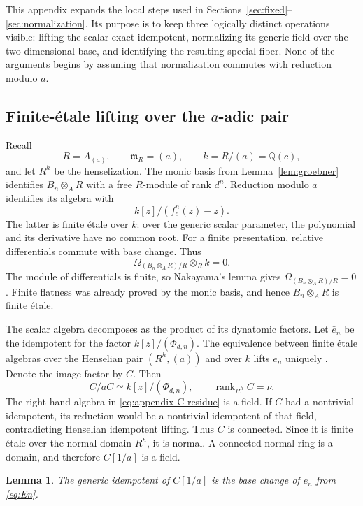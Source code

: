 \documentclass[11pt]{article}
\newtheorem{lemma}[theorem]{Lemma}
\theoremstyle{definition}
\theoremstyle{remark}
\newcommand{\Q}{\mathbb{Q}}
\newcommand{\etale}{\'{e}tale}
\begin{document}
This appendix expands the local steps used in
Sections~\ref{sec:fixed}--\ref{sec:normalization}.  Its purpose is to keep
three logically distinct operations visible: lifting the scalar exact
idempotent, normalizing its generic field over the two-dimensional base, and
identifying the resulting special fiber.  None of the arguments begins by
assuming that normalization commutes with reduction modulo $a$.

\subsection{Finite-\etale{} lifting over the $a$-adic pair}

Recall
\[
 R=A_{(a)},\qquad \mathfrak m_R=(a),\qquad
 k=R/(a)=\Q(c),
\]
and let $R^h$ be the henselization.  The monic basis from
Lemma~\ref{lem:groebner} identifies $B_n\otimes_AR$ with a free $R$-module
of rank $d^n$.  Reduction modulo $a$ identifies its algebra with
\[
 k[z]/(f_c^n(z)-z).
\]
The latter is finite \etale{} over $k$: over the generic scalar parameter,
the polynomial and its derivative have no common root.  For a finite
presentation, relative differentials commute with base change.  Thus
\[
 \Omega_{(B_n\otimes_AR)/R}\otimes_Rk=0.
\]
The module of differentials is finite, so Nakayama's lemma gives
$\Omega_{(B_n\otimes_AR)/R}=0$.  Finite flatness was already proved by the
monic basis, and hence $B_n\otimes_AR$ is finite \etale{}.

The scalar algebra decomposes as the product of its dynatomic factors.  Let
$\bar e_n$ be the idempotent for the factor
$k[z]/(\Phi_{d,n})$.  The equivalence between finite \etale{} algebras over
the Henselian pair $(R^h,(a))$ and over $k$ lifts $\bar e_n$ uniquely
\citep{stacks-0d49}.  Denote the image factor by $C$.  Then
\begin{equation}\label{eq:appendix-C-residue}
 C/aC\simeq k[z]/(\Phi_{d,n}),\qquad
 \operatorname{rank}_{R^h}C=\nu.
\end{equation}
The right-hand algebra in \eqref{eq:appendix-C-residue} is a field.  If $C$
had a nontrivial idempotent, its reduction would be a nontrivial idempotent
of that field, contradicting Henselian idempotent lifting.  Thus $C$ is
connected.  Since it is finite \etale{} over the normal domain $R^h$, it is
normal.  A connected normal ring is a domain, and therefore $C[1/a]$ is a
field.

\begin{lemma}\label{lem:appendix-idempotent-identification}
The generic idempotent of $C[1/a]$ is the base change of $e_n$ from
\eqref{eq:En}.
\end{lemma}
\end{document}
